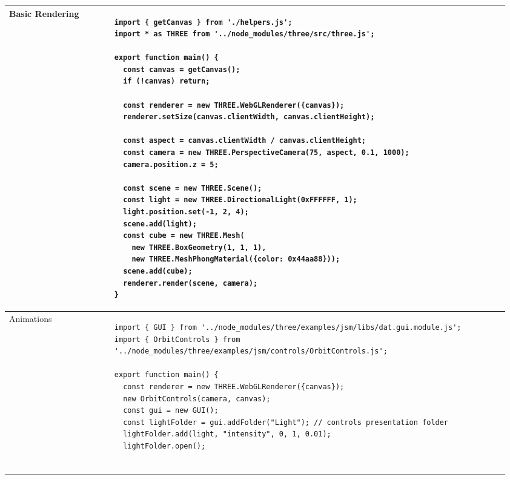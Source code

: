 \documentclass[main.tex,fontsize=8pt,paper=a4,paper=portrait,DIV=calc,]{scrartcl}
\begin{document}
\pagebreak
\begin{table}[ht!]
\begin{tabular}{|m{0.2\linewidth}|m{0.755\linewidth}|}
\hline
Basic Rendering & 
\begin{lstlisting}
import { getCanvas } from './helpers.js';
import * as THREE from '../node_modules/three/src/three.js';

export function main() {
  const canvas = getCanvas();
  if (!canvas) return;

  const renderer = new THREE.WebGLRenderer({canvas});
  renderer.setSize(canvas.clientWidth, canvas.clientHeight);
  
  const aspect = canvas.clientWidth / canvas.clientHeight;
  const camera = new THREE.PerspectiveCamera(75, aspect, 0.1, 1000);
  camera.position.z = 5;
  
  const scene = new THREE.Scene();
  const light = new THREE.DirectionalLight(0xFFFFFF, 1);
  light.position.set(-1, 2, 4);
  scene.add(light);
  const cube = new THREE.Mesh(
    new THREE.BoxGeometry(1, 1, 1),
    new THREE.MeshPhongMaterial({color: 0x44aa88}));
  scene.add(cube);
  renderer.render(scene, camera);
}
\end{lstlisting}\\
\hline
Animations & 
\begin{lstlisting}
import { GUI } from '../node_modules/three/examples/jsm/libs/dat.gui.module.js';
import { OrbitControls } from '../node_modules/three/examples/jsm/controls/OrbitControls.js';

export function main() {
  const renderer = new THREE.WebGLRenderer({canvas});
  new OrbitControls(camera, canvas);
  const gui = new GUI();
  const lightFolder = gui.addFolder("Light"); // controls presentation folder
  lightFolder.add(light, "intensity", 0, 1, 0.01);
  lightFolder.open();


\end{lstlisting}
\end{tabular}
\end{table}
\end{document}
